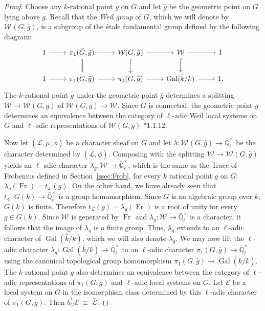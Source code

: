 \documentclass[10pt]{amsart}
\theoremstyle{plain}
\theoremstyle{definition}
\newcommand{\EE}{\mathbb{\bar Q}_\ell}
\newcommand{\bFq}{\bar{k}}
\newcommand{\Fq}{k}
\newcommand{\EEx}{\EE^\times}
\newcommand{\Weil}[1]{\mathcal{W}_{#1}}
\DeclareMathOperator{\Gal}{Gal}
\newcommand{\Frob}[1]{\operatorname{Fr}_{#1}}
\newcommand{\iso}{{\ \cong\ }}
\newcommand{\trFrob}[1]{t_{#1}}
\newcommand{\cs}[1]{{\mathcal{#1}}}
\newcommand{\gcs}[1]{{\mathcal{\bar #1}}}
\newcommand{\bg}{{\bar{g}}}
\newcommand{\bG}{\bar{G}}
\begin{document}
\begin{proof}
Choose any $\Fq$-rational point $g$ on $G$ and let $\bg$ be the geometric point on $G$ lying above $g$.
Recall that the \emph{Weil group} of $G$, which we will denote by $\Weil{}(G,\bg)$, is a subgroup of the \'etale
fundamental group defined by the following diagram:
\[
 \begin{tikzcd}
 1 \rar & \ar[equal]{d} \pi_1(\bG, \bg) \rar & \Weil{}(G,\bg) \rar \dar[hook] & \Weil{} \rar \dar[hook] & 1 \\
 1 \rar &  \pi_1(\bG, \bg) \rar & \pi_1(G,\bg) \rar & \Gal(\bFq/\Fq) \rar & 1.
 \end{tikzcd}
\]
The $\Fq$-rational point $g$ under the geometric point $\bg$ determines a splitting
$\Weil{}\to \Weil{}(G,\bg)$ of $\Weil{}(G,\bg)\to \Weil{}$.
%
  Since $G$ is connected, the geometric point $\bg$ determines
  an equivalence between the category of $\ell$-adic Weil local systems on $G$ and
  $\ell$-adic representations of $\Weil{}(G,\bg)$ \cite{deligne:80a}*{1.1.12}.
  
  Now let $(\gcs{L},\mu,\phi)$ be a character sheaf on $G$
  and let $\lambda : \Weil{}(G, \bg) \to \EEx$ be the character determined by $(\gcs{L},\phi)$.
  Composing with the splitting $\Weil{} \to \Weil{}(G,\bg)$ yields an $\ell$-adic character
  $\lambda_g : \Weil{} \to \EEx$, which is the same as the Trace of Frobenius defined in Section~\ref{ssec:Frob}, for every $\Fq$ rational point $g$ on $G$:
  $
  \lambda_g(\Frob{}) =  \trFrob{\cs{L}}(g).
  $
%
  On the other hand, we have already seen that $\trFrob{\cs{L}} : G(\Fq) \to \EEx$
  is a group homomorphism. 
  Since $G$ is an algebraic group over $\Fq$, $G(\Fq)$ is finite.
  Therefore $\trFrob{\cs{L}}(g) = \lambda_g(\Frob{})$ is a root of unity
  for every $g\in G(\Fq)$.  Since $\Weil{}$ is generated by
  $\Frob{}$ and $\lambda_g : \Weil{} \to \EEx$ is
  a character, it follows that the image of $\lambda_g$ is a finite group.
  Thus, $\lambda_g$ extends to an $\ell$-adic character of $\Gal(\bFq/\Fq)$,
  which we will also denote $\lambda_g$.
%
  We may now lift the $\ell$-adic character $\lambda_g : \Gal(\bFq/\Fq) \to \EEx$
  to an $\ell$-adic character $\pi_1(G,\bg) \to \EEx$ using the canonical topological group homomorphism
  $\pi_1(G,\bg) \to \Gal(\bFq/\Fq)$. 
  The $\Fq$ rational point $g$ also
  determines an equivalence between the category of $\ell$-adic
  representations of $\pi_1(G,\bg)$ and $\ell$-adic local systems on $G$. Let
  $\cs{E}$ be a local system on $G$ in the isomorphism class
  determined by this $\ell$-adic character of $\pi_1(G,\bg)$.
  Then $b_G^*\cs{E} \iso \gcs{L}$.
  

\end{proof}
\end{document}
